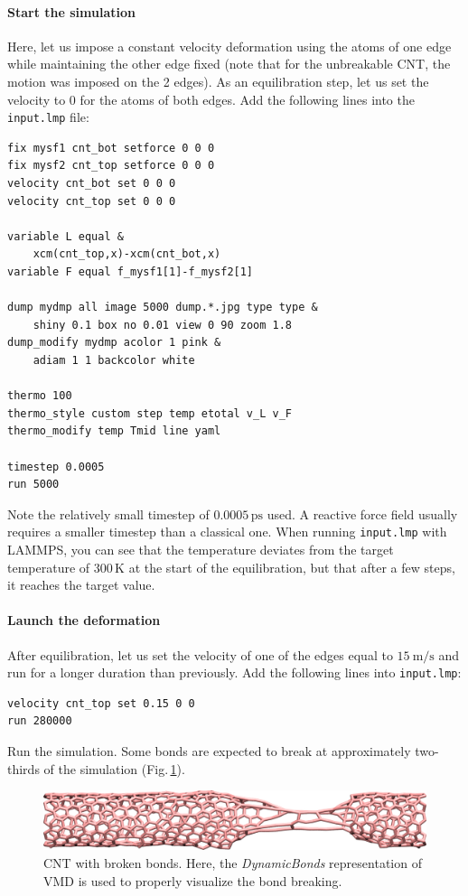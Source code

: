 \documentclass[9pt,tutorial]{livecoms}
\newcommand{\flecmd}[1]{\textcolor{command}{\texttt{#1}}} %
\begin{document}
\paragraph{Start the simulation}
Here, let us impose a constant velocity deformation using the atoms of one
edge while maintaining the other edge fixed (note that for the unbreakable CNT,
the motion was imposed on the 2 edges). As an equilibration step, let us set the
velocity to 0 for the atoms of both edges. Add the following lines into
the \flecmd{input.lmp} file:
\begin{lstlisting}
fix mysf1 cnt_bot setforce 0 0 0
fix mysf2 cnt_top setforce 0 0 0
velocity cnt_bot set 0 0 0
velocity cnt_top set 0 0 0

variable L equal &
    xcm(cnt_top,x)-xcm(cnt_bot,x)
variable F equal f_mysf1[1]-f_mysf2[1]

dump mydmp all image 5000 dump.*.jpg type type &
    shiny 0.1 box no 0.01 view 0 90 zoom 1.8
dump_modify mydmp acolor 1 pink &
    adiam 1 1 backcolor white

thermo 100
thermo_style custom step temp etotal v_L v_F
thermo_modify temp Tmid line yaml

timestep 0.0005
run 5000
\end{lstlisting}
Note the relatively small timestep of $0.0005\,\text{ps}$ used. A reactive force
field usually requires a smaller timestep than a classical one. When running
\flecmd{input.lmp} with LAMMPS, you can see that the temperature deviates
from the target temperature of $300\,\text{K}$ at the start of the equilibration,
but that after a few steps, it reaches the target value.

\paragraph{Launch the deformation}
After equilibration, let us set the velocity of one of the edges equal to
$15~\text{m/s}$ and run for a longer duration than previously. Add the following
lines into \flecmd{input.lmp}:
\begin{lstlisting}
velocity cnt_top set 0.15 0 0
run 280000
\end{lstlisting}
Run the simulation. Some bonds are expected to break at approximately
two-thirds of the simulation (Fig.\,\ref{fig:CNT-deformed-breakable}).

\begin{figure}
\centering
\includegraphics[width=\linewidth]{CNT-deformed-breakable}
\caption{CNT with broken bonds. Here, the \textit{DynamicBonds} representation
of VMD is used to properly visualize the bond breaking.}
\label{fig:CNT-deformed-breakable}
\end{figure}
\end{document}

